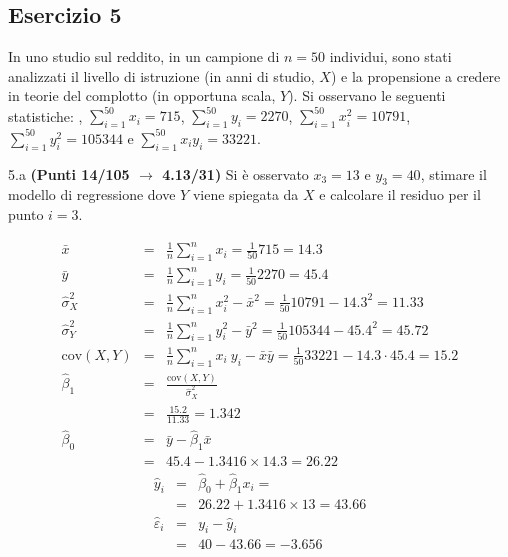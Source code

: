 \documentclass[
  11pt,
]{book}
\theoremstyle{mytheoremstyle}
\theoremstyle{mydefstyle}
\newenvironment{sol}
  {
  \begin{tcolorbox}[enhanced,breakable,arc=0.1mm,boxrule=1pt,colback=white,colframe=iblue,
  title=\bf \fontfamily{lmss}\selectfont \hspace{.5 cm} Soluzione,drop fuzzy shadow]

}{
\end{tcolorbox}
  }
\begin{document}
\subsection{Esercizio 5}\label{esercizio-5-33}

In uno studio sul reddito, in un campione di \(n=50\) individui, sono stati analizzati il livello di istruzione (in anni di studio, \(X\)) e la propensione a credere in teorie del complotto (in opportuna scala, \(Y\)).
Si osservano le seguenti statistiche:
, \(\sum_{i=1}^{50}x_i=715\), \(\sum_{i=1}^{50}y_i=2270\),
\(\sum_{i=1}^{50}x_i^2=10791\), \(\sum_{i=1}^{50}y_i^2=105344\) e \(\sum_{i=1}^{50}x_iy_i=33221\).

5.a \textbf{(Punti 14/105 \(\rightarrow\) 4.13/31)} Si è osservato \(x_3=13\) e \(y_3=40\), stimare il modello di regressione dove \(Y\) viene spiegata da \(X\) e calcolare il residuo per il punto \(i=3\).

\begin{sol}
\begin{eqnarray*}
           \bar x &=&\frac 1 n\sum_{i=1}^n x_i = \frac {1}{ 50 }  715 =  14.3 \\
           \bar y &=&\frac 1 n\sum_{i=1}^n y_i = \frac {1}{ 50 }  2270 =  45.4 \\
           \hat\sigma_X^2&=&\frac 1 n\sum_{i=1}^n x_i^2-\bar x^2=\frac {1}{ 50 }  10791  - 14.3 ^2= 11.33 \\
           \hat\sigma_Y^2&=&\frac 1 n\sum_{i=1}^n y_i^2-\bar y^2=\frac {1}{ 50 }  105344  - 45.4 ^2= 45.72 \\
           \text{cov}(X,Y)&=&\frac 1 n\sum_{i=1}^n x_i~y_i-\bar x\bar y=\frac {1}{ 50 }  33221 - 14.3 \cdot 45.4 = 15.2 \\
           \hat\beta_1 &=& \frac{\text{cov}(X,Y)}{\hat\sigma_X^2} \\
                    &=& \frac{ 15.2 }{ 11.33 }  =  1.342 \\
           \hat\beta_0 &=& \bar y - \hat\beta_1 \bar x\\
                    &=&  45.4 - 1.3416 \times  14.3 = 26.22 
         \end{eqnarray*}\begin{eqnarray*}
\hat y_i &=&\hat\beta_0+\hat\beta_1 x_i=\\ 
&=& 26.22 + 1.3416 \times 13 = 43.66 \\ 
\hat \varepsilon_i &=& y_i-\hat y_i\\ 
&=& 40 - 43.66 = -3.656  
\end{eqnarray*}

\end{sol}
\end{document}
